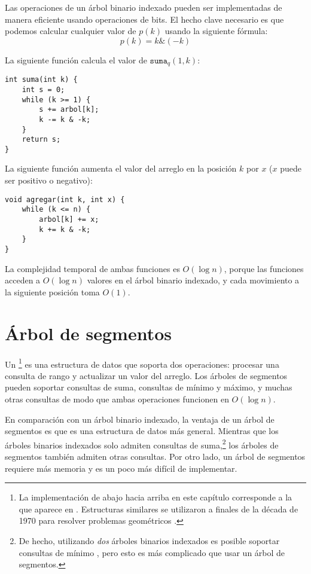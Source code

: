 Las operaciones de un árbol binario indexado pueden ser
implementadas de manera eficiente usando operaciones de bits.
El hecho clave necesario es que podemos
calcular cualquier valor de $p(k)$ usando la siguiente fórmula:
\[p(k) = k \& (-k)\]

La siguiente función calcula el valor de $\texttt{suma}_q(1,k)$:
\begin{lstlisting}
int suma(int k) {
    int s = 0;
    while (k >= 1) {
        s += arbol[k];
        k -= k & -k;
    }
    return s;
}
\end{lstlisting}

\newpage
La siguiente función aumenta el
valor del arreglo en la posición $k$ por $x$
($x$ puede ser positivo o negativo):

\begin{lstlisting}
void agregar(int k, int x) {
    while (k <= n) {
        arbol[k] += x;
        k += k & -k;
    }
}
\end{lstlisting}

La complejidad temporal de ambas funciones es
$O(\log n)$, porque las funciones acceden a $O(\log n)$
valores en el árbol binario indexado, y cada movimiento
a la siguiente posición toma $O(1)$.

\section{Árbol de segmentos}


Un \footnote{La implementación de abajo hacia arriba en este capítulo corresponde
    a la que aparece en \cite{sta06}. Estructuras similares se utilizaron
    a finales de la década de 1970 para resolver problemas geométricos \cite{ben80}.} es una estructura de datos
que soporta dos operaciones:
procesar una consulta de rango y
actualizar un valor del arreglo.
Los árboles de segmentos pueden soportar
consultas de suma, consultas de mínimo y máximo, y muchas otras
consultas de modo que ambas operaciones funcionen en $O(\log n)$.

En comparación con un árbol binario indexado,
la ventaja de un árbol de segmentos es que es
una estructura de datos más general.
Mientras que los árboles binarios indexados solo admiten
consultas de suma,\footnote{De hecho, utilizando \emph{dos} árboles
    binarios indexados es posible soportar consultas de mínimo \cite{dim15},
    pero esto es más complicado que usar un árbol de segmentos.}
los árboles de segmentos también admiten otras consultas.
Por otro lado, un árbol de segmentos requiere más
memoria y es un poco más difícil de implementar.

